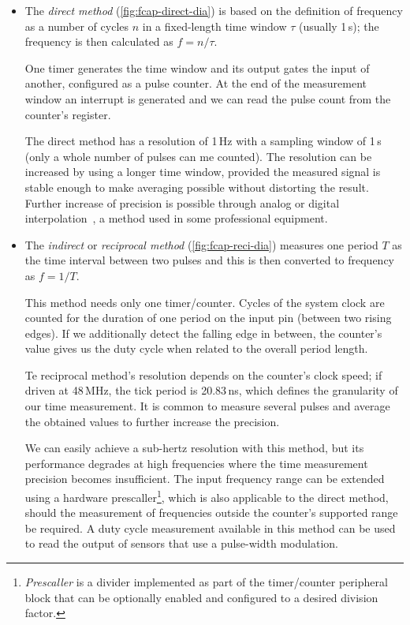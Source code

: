\begin{itemize}
	\item The \textit{direct method} (\cref{fig:fcap-direct-dia}) is based on the definition of frequency as a number of cycles $n$ in a fixed-length time window $\tau$ (usually 1\,s); the frequency is then calculated as $f=n/\tau$.

	One timer generates the time window and its output gates the input of another, configured as a pulse counter. At the end of the measurement window an interrupt is generated and we can read the pulse count from the counter's register.

	The direct method has a resolution of 1\,Hz with a sampling window of 1\,s (only a whole number of pulses can me counted). The resolution can be increased by using a longer time window, provided the measured signal is stable enough to make averaging possible without distorting the result. Further increase of precision is possible through analog or digital interpolation~\cite{fcap-increasing}, a method used in some professional equipment.

	\item The \textit{indirect} or \textit{reciprocal method} (\cref{fig:fcap-reci-dia}) measures one period $T$ as the time interval between two pulses and this is then converted to frequency as $f=1/T$.

	This method needs only one timer/counter. Cycles of the system clock are counted for the duration of one period on the input pin (between two rising edges). If we additionally detect the falling edge in between, the counter's value gives us the duty cycle when related to the overall period length.

	Te reciprocal method's resolution depends on the counter's clock speed; if driven at 48\,MHz, the tick period is 20.83\,ns, which defines the granularity of our time measurement. It is common to measure several pulses and average the obtained values to further increase the precision.

	We can easily achieve a sub-hertz resolution with this method, but its performance degrades at high frequencies where the time measurement precision becomes insufficient. The input frequency range can be extended using a hardware prescaller\footnote{\textit{Prescaller} is a divider implemented as part of the timer/counter peripheral block that can be optionally enabled and configured to a desired division factor.}, which is also applicable to the direct method, should the measurement of frequencies outside the counter's supported range be required. A duty cycle measurement available in this method can be used to read the output of sensors that use a pulse-width modulation.

\end{itemize}

